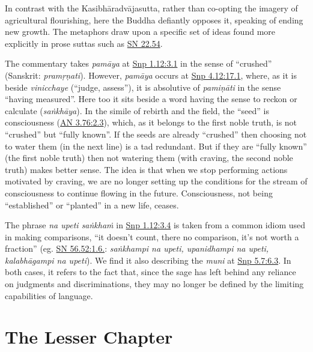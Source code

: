 \documentclass[12pt,openany]{book}%
\begin{document}
In contrast with the \textsanskrit{Kasibhāradvājasutta}, rather than co-opting the imagery of agricultural flourishing, here the Buddha defiantly opposes it, speaking of ending new growth. The metaphors draw upon a specific set of ideas found more explicitly in prose suttas such as \href{https://suttacentral.net/sn22.54/en/sujato}{SN 22.54}.

The commentary takes \textit{\textsanskrit{pamāya}} at \href{https://suttacentral.net/snp1.12/en/sujato\#3.1}{Snp 1.12:3.1} in the sense of “crushed” (Sanskrit: \textit{\textsanskrit{pramṛṇati}}). However, \textit{\textsanskrit{pamāya}} occurs at \href{https://suttacentral.net/snp4.12/en/sujato\#17.1}{Snp 4.12:17.1}, where, as it is beside \textit{vinicchaye} (“judge, assess”), it is absolutive of \textit{\textsanskrit{pamiṇāti}} in the sense “having measured”. Here too it sits beside a word having the sense to reckon or calculate (\textit{\textsanskrit{saṅkhāya}}). In the simile of rebirth and the field, the “seed” is consciousness (\href{https://suttacentral.net/an3.76/en/sujato\#2.3}{AN 3.76:2.3}), which, as it belongs to the first noble truth, is not “crushed” but “fully known”. If the seeds are already “crushed” then choosing not to water them (in the next line) is a tad redundant. But if they are “fully known” (the first noble truth) then not watering them (with craving, the second noble truth) makes better sense. The idea is that when we stop performing actions motivated by craving, we are no longer setting up the conditions for the stream of consciousness to continue flowing in the future. Consciousness, not being “established” or “planted” in a new life, ceases.

The phrase \textit{na upeti \textsanskrit{saṅkhaṁ}} in \href{https://suttacentral.net/snp1.12/en/sujato\#3.4}{Snp 1.12:3.4} is taken from a common idiom used in making comparisons, “it doesn’t count, there no comparison, it’s not worth a fraction” (eg. \href{https://suttacentral.net/sn56.52/en/sujato\#1.6.}{SN 56.52:1.6.}: \textit{\textsanskrit{saṅkhampi} na upeti, upanidhampi na upeti, \textsanskrit{kalabhāgampi} na upeti}). We find it also describing the \textit{muni} at \href{https://suttacentral.net/snp5.7/en/sujato\#6.3}{Snp 5.7:6.3}. In both cases, it refers to the fact that, since the sage has left behind any reliance on judgments and discriminations, they may no longer be defined by the limiting capabilities of language.

\section*{The Lesser Chapter}
\end{document}
